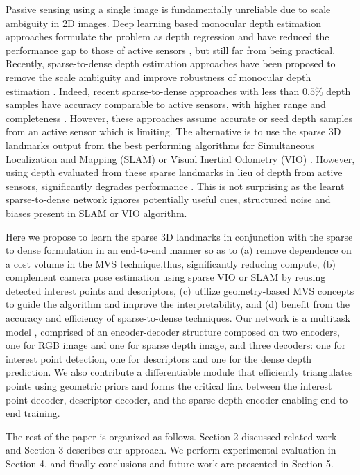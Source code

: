 \documentclass[runningheads]{llncs}
\begin{document}
Passive sensing using a single image is fundamentally unreliable due to scale ambiguity in 2D images. Deep learning based monocular depth estimation approaches formulate the problem as depth regression \cite{eigen2015predicting,fu2018deep} and have reduced the performance gap to those of active sensors \cite{lee2019big,lasinger2019towards}, but still far from being practical. Recently, sparse-to-dense depth estimation approaches have been proposed to remove the scale ambiguity and improve robustness of monocular depth estimation \cite{Ma2017SparseToDense}. Indeed, recent sparse-to-dense approaches with less than $0.5\%$ depth samples have accuracy comparable to active sensors, with higher range and completeness \cite{chen2018estimating} . However, these approaches assume accurate or seed depth samples from an active sensor which is limiting. The alternative is to use the sparse 3D landmarks output from the best performing algorithms for Simultaneous Localization and Mapping (SLAM) \cite{mur2015orb} or Visual Inertial Odometry (VIO) \cite{nister2004visual}. However, using depth evaluated from these sparse landmarks in lieu of depth from active sensors, significantly degrades performance \cite{deep2018funk}. This is not surprising as the learnt sparse-to-dense network ignores potentially useful cues, structured noise and biases present in SLAM or VIO algorithm. 

Here we propose to learn the sparse 3D landmarks in conjunction with the sparse to dense formulation in an end-to-end manner so as to (a) remove dependence on a cost volume in the MVS technique,thus, significantly reducing compute, (b) complement camera pose estimation using sparse VIO or SLAM by reusing detected interest points and descriptors, (c) utilize  geometry-based MVS concepts to guide the algorithm and improve the interpretability,  and (d) benefit from the accuracy and efficiency of sparse-to-dense techniques. Our network is a multitask model \cite{kendall2018multi}, comprised of an encoder-decoder structure composed on two encoders, one for RGB image and one for sparse depth image, and three decoders: one for interest point detection, one for descriptors and one for the dense depth prediction. We also contribute a differentiable module that efficiently triangulates points using geometric priors and forms the critical link between the interest point decoder, descriptor decoder, and the sparse depth encoder enabling end-to-end training.   
 
The rest of the paper is organized as follows. Section 2 discussed related work and Section 3 describes our approach. We perform experimental evaluation in Section 4, and finally conclusions and future work are presented in Section 5. 
\end{document}
